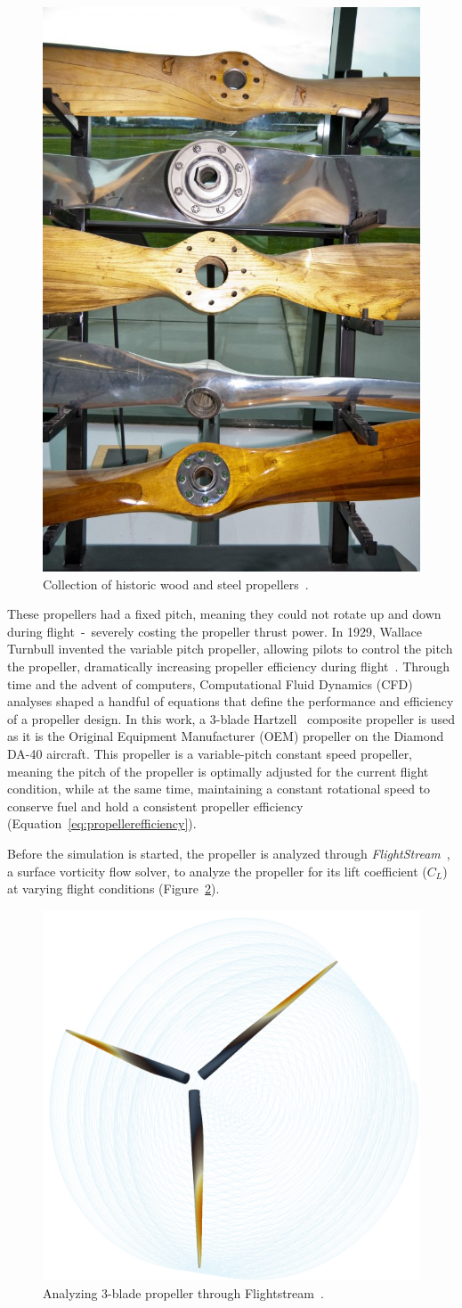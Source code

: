 \documentclass[12pt]{report}
\begin{document}
\begin{figure}[!ht]\label{fig:woodprops}
  \centering
  \includegraphics[width=0.3\linewidth]{Figures/woodProps.jpg}
  \caption{Collection of historic wood and steel propellers~\cite{ianHowIdentifyHistoric2016}.}
\end{figure}

These propellers had a fixed pitch, meaning they could not rotate up and down during flight~-~severely costing the propeller thrust power. In 1929, Wallace Turnbull invented the variable pitch propeller, allowing pilots to control the pitch the propeller, dramatically increasing propeller efficiency during flight~\cite{ianShortHistoryAircraft2018}. Through time and the advent of computers, Computational Fluid Dynamics (CFD) analyses shaped a handful of equations that define the performance and efficiency of a propeller design. In this work, a 3-blade Hartzell~\cite{HartzellPropellerInc} composite propeller is used as it is the Original Equipment Manufacturer (OEM) propeller on the Diamond DA-40 aircraft. This propeller is a variable-pitch constant speed propeller, meaning the pitch of the propeller is optimally adjusted for the current flight condition, while at the same time, maintaining a constant rotational speed to conserve fuel and hold a consistent propeller efficiency (Equation~\ref{eq:propellerefficiency}).

Before the simulation is started, the propeller is analyzed through \textit{FlightStream}~\cite{FlightStream}, a surface vorticity flow solver, to analyze the propeller for its lift coefficient (\(C_L\)) at varying flight conditions (Figure~\ref{fig:flightstreamprop}).

\begin{figure}[!ht]\label{fig:flightstreamprop}
  \centering
  \includegraphics[width=.35\linewidth]{Figures/flightstreamprop.png}
  \caption{Analyzing 3-blade propeller through Flightstream~\cite{FlightStream}.}
\end{figure}
\end{document}

